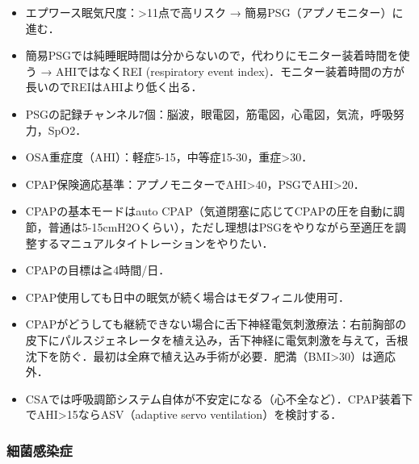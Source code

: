 \begin{itemize}
\item エプワース眠気尺度：>11点で高リスク → 簡易PSG（アプノモニター）に進む．


\item 簡易PSGでは純睡眠時間は分からないので，代わりにモニター装着時間を使う → AHIではなくREI (respiratory event index)．モニター装着時間の方が長いのでREIはAHIより低く出る．
\item PSGの記録チャンネル7個：脳波，眼電図，筋電図，心電図，気流，呼吸努力，SpO2．
\item OSA重症度（AHI）：軽症5-15，中等症15-30，重症>30．
\item CPAP保険適応基準：アプノモニターでAHI>40，PSGでAHI>20．
\item CPAPの基本モードはauto CPAP（気道閉塞に応じてCPAPの圧を自動に調節，普通は5-15cmH2Oくらい），ただし理想はPSGをやりながら至適圧を調整するマニュアルタイトレーションをやりたい．
\item CPAPの目標は≧4時間/日．
\item CPAP使用しても日中の眠気が続く場合はモダフィニル使用可．
\item CPAPがどうしても継続できない場合に舌下神経電気刺激療法：右前胸部の皮下にパルスジェネレータを植え込み，舌下神経に電気刺激を与えて，舌根沈下を防ぐ．最初は全麻で植え込み手術が必要．肥満（BMI>30）は適応外．
\item CSAでは呼吸調節システム自体が不安定になる（心不全など）．CPAP装着下でAHI>15ならASV（adaptive servo ventilation）を検討する．
\end{itemize}


\subsubsection{細菌感染症}


